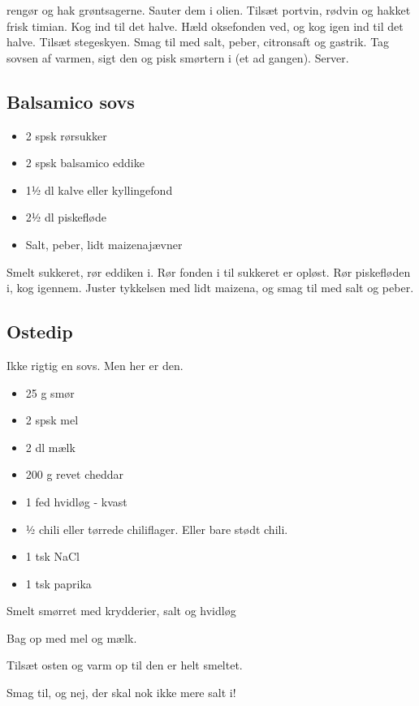 \documentclass[
]{book}
\providecommand{\tightlist}{%
  \setlength{\itemsep}{0pt}\setlength{\parskip}{0pt}}
\begin{document}
rengør og hak grøntsagerne.
Sauter dem i olien.
Tilsæt portvin, rødvin og hakket frisk timian. Kog ind til det halve.
Hæld oksefonden ved, og kog igen ind til det halve. Tilsæt stegeskyen.
Smag til med salt, peber, citronsaft og gastrik.
Tag sovsen af varmen, sigt den og pisk smørtern i (et ad gangen). Server.

\subsection{Balsamico sovs}\label{balsamico-sovs}

\begin{itemize}
\tightlist
\item
  2 spsk rørsukker
\item
  2 spsk balsamico eddike
\item
  1½ dl kalve eller kyllingefond
\item
  2½ dl piskefløde
\item
  Salt, peber, lidt maizenajævner
\end{itemize}

Smelt sukkeret, rør eddiken i. Rør fonden i til sukkeret er opløst. Rør piskefløden i, kog igennem. Juster tykkelsen med lidt maizena, og smag til med salt og peber.

\subsection{Ostedip}\label{ostedip}

Ikke rigtig en sovs. Men her er den.

\begin{itemize}
\tightlist
\item
  25 g smør
\item
  2 spsk mel
\item
  2 dl mælk
\item
  200 g revet cheddar
\item
  1 fed hvidløg - kvast
\item
  ½ chili eller tørrede chiliflager. Eller bare stødt chili.
\item
  1 tsk NaCl
\item
  1 tsk paprika
\end{itemize}

Smelt smørret med krydderier, salt og hvidløg

Bag op med mel og mælk.

Tilsæt osten og varm op til den er helt smeltet.

Smag til, og nej, der skal nok ikke mere salt i!
\end{document}
